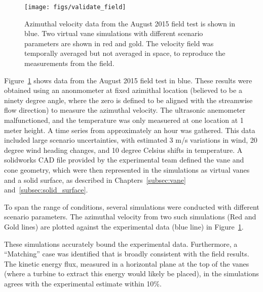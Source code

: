  \begin{figure}[!htb]
  \begin{center}
   \texttt{[image: figs/validate\_field]}
   \caption{Azimuthal velocity data from the August 2015 field test is
   shown in blue. Two virtual vane simulations with different scenario
   parameters are shown in red and gold. The velocity field was
   temporally averaged but not averaged in space, to reproduce
   the measurements from the field.}
   \label{fig:field_val}
  \end{center}
 \end{figure}
%
%

Figure~\ref{fig:field_val} shows data from the August 2015 field test in
blue. These results were obtained using an anonmometer at fixed
azimithal location (believed to be a ninety degree angle, where the zero
is defined to be aligned with the streamwise flow direction) to measure the
azimuthal velocity. The ultrasonic 
anemometer malfunctioned, and the temperature was only measuered at one
location at 1 meter height. A time series from approximately an hour was
gathered. This data included large scenario uncertainties, with
estimated 3 m/s variations in wind, 20 degree wind heading changes, and
10 degree Celsius shifts in temperature. A solidworks CAD file provided
by the experimental team defined the vane and cone
geometry, which were then represented in the simulations as virtual
vanes and a solid surface, as described in 
Chapters~\ref{subsec:vane} and~\ref{subsec:solid_surface}.   

To span the range of conditions, several simulations were conducted
with different scenario parameters. The azimuthal velocity from two such
simulations (Red and Gold lines) are plotted against the experimental
data (blue line) in Figure~\ref{fig:field_val}.  

These simulations accurately bound the experimental data. Furthermore, a
``Matching'' case was identified that is broadly consistent with the
field results. The kinetic energy flux, measured in a horizontal plane
at the top of the vanes (where a turbine to extract this energy would
likely be placed), in the simulations agrees with the experimental
estimate within 10\%. 


%
% 
%
% 
%
%
%
%

